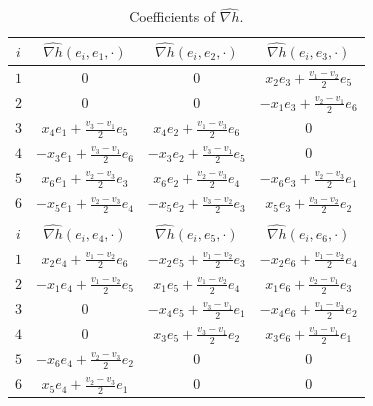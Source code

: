 \documentclass[12pt]{scrartcl}
\theoremstyle{plain}
\theoremstyle{definition}
\begin{document}
\begin{table}[t]
\centering
\begin{tabular}{c||c|c|c}
$i$&$\widehat{\nabla h}(e_i,e_1,\cdot)$&$\widehat{\nabla h}(e_i,e_2,\cdot)$&$\widehat{\nabla h}(e_i,e_3,\cdot)$\\\hline
$1$&$0$&$0$&$x_2e_3+\frac{v_1-v_2}{2}e_5$\\
$2$&$0$&$0$&$-x_1e_3+\frac{v_2-v_1}{2}e_6$\\
$3$&$x_4e_1+\frac{v_3-v_1}{2}e_5$&$x_4e_2+\frac{v_1-v_3}{2}e_6$&$0$\\
$4$&$-x_3e_1+\frac{v_3-v_1}{2}e_6$&$-x_3e_2+\frac{v_3-v_1}{2}e_5$&$0$\\
$5$&$x_6e_1+\frac{v_2-v_3}{2}e_3$&$x_6e_2+\frac{v_2-v_3}{2}e_4$&$-x_6e_3+\frac{v_2-v_3}{2}e_1$\\
$6$&$-x_5e_1+\frac{v_2-v_3}{2}e_4$&$-x_5e_2+\frac{v_3-v_2}{2}e_3$&$x_5e_3+\frac{v_3-v_2}{2}e_2$\\
\multicolumn{4}{c}{}\\
$i$&$\widehat{\nabla h}(e_i,e_4,\cdot)$&$\widehat{\nabla h}(e_i,e_5,\cdot)$&$\widehat{\nabla h}(e_i,e_6,\cdot)$\\\hline
$1$&$x_2e_4+\frac{v_1-v_2}{2}e_6$&$-x_2e_5+\frac{v_1-v_2}{2}e_3$&$-x_2e_6+\frac{v_1-v_2}{2}e_4$\\
$2$&$-x_1e_4+\frac{v_1-v_2}{2}e_5$&$x_1e_5+\frac{v_1-v_2}{2}e_4$&$x_1e_6+\frac{v_2-v_1}{2}e_3$\\
$3$&$0$&$-x_4e_5+\frac{v_3-v_1}{2}e_1$&$-x_4e_6+\frac{v_1-v_3}{2}e_2$\\
$4$&$0$&$x_3e_5+\frac{v_3-v_1}{2}e_2$&$x_3e_6+\frac{v_3-v_1}{2}e_1$\\
$5$&$-x_6e_4+\frac{v_2-v_3}{2}e_2$&$0$&$0$\\
$6$&$x_5e_4+\frac{v_2-v_3}{2}e_1$&$0$&$0$\\
\end{tabular}
\caption{Coefficients of $\widehat{\nabla h}$.}
\label{nablahcoef}
\end{table}
\end{document}
